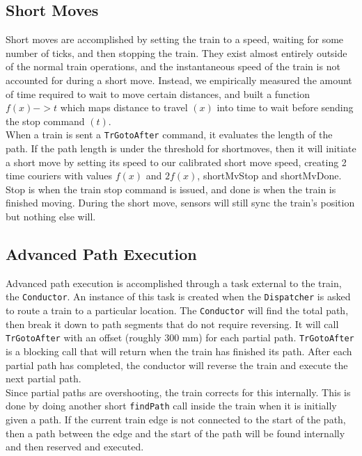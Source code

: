 \documentclass[12pt]{article}
\begin{document}
\subsection{Short Moves}
Short moves are accomplished by setting the train to a speed, waiting for some number of ticks, and then stopping the
train. They exist almost entirely outside of the normal train operations, and the instantaneous speed of the train is
not accounted for during a short move. Instead, we empirically measured the amount of time required to wait to move
certain distances, and built a function $f(x) -> t$ which maps distance to travel $(x)$ into time to wait before sending the
stop command $(t)$.
\\
When a train is sent a \texttt{TrGotoAfter} command, it evaluates the length of the path. If the path length is under
the threshold for shortmoves, then it will initiate a short move by setting its speed to our calibrated short move
speed, creating 2 time couriers with values $f(x)$ and $2f(x)$, shortMvStop and shortMvDone. Stop is when the train
stop command is issued, and done is when the train is finished moving. During the short move, sensors will still sync
the train's position but nothing else will.
\\[1\baselineskip]
\subsection{Advanced Path Execution}
Advanced path execution is accomplished through a task external to the train, the \texttt{Conductor}. An instance of
this task is created when the \texttt{Dispatcher} is asked to route a train to a particular location. The
\texttt{Conductor} will find the total path, then break it down to path segments that do not require reversing. It will
call \texttt{TrGotoAfter} with an offset (roughly 300 mm) for each partial path. \texttt{TrGotoAfter} is a blocking call
that will return when the train has finished its path. After each partial path has completed, the conductor will reverse
the train and execute the next partial path.
\\
Since partial paths are overshooting, the train corrects for this internally. This is done by doing another short
\texttt{findPath} call inside the train when it is initially given a path. If the current train edge is not connected to
the start of the path, then a path between the edge and the start of the path will be found internally and then reserved
and executed.
\\[1\baselineskip]
\end{document}

